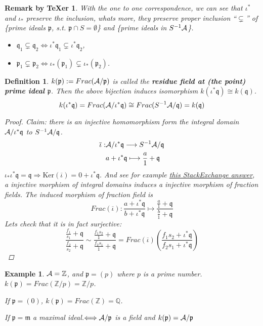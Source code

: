 \documentclass[11pt]{article}
\newtheorem{dfn}[thm]{Definition}
\newtheorem{rmkt}[thm]{Remark by TeXer}
\newtheorem{ex}[thm]{Example}
\newcommand{\intg}{\mathbb Z}
\newcommand{\ratl}{\mathbb Q}
\newcommand{\scm}{{\mathfrak m}}
\newcommand{\scp}{{\mathfrak p}}
\newcommand{\scq}{\mathfrak q}
\newcommand{\cala}{{\cal A}}
\newcommand{\Lrta}{\Longrightarrow}
\newcommand{\lrta}{\longrightarrow}
\newcommand{\Llrta}{\Longleftrightarrow}
\begin{document}
\begin{rmkt}
With the one to one correspondence, we can see that $\iota^*$ and $\iota_*$ preserve the inclusion, whats more, they preserve proper inclusion ``$\subsetneq$'' of \{prime ideals $\scp$, s.t. $\scp\cap S=\emptyset$\} and \{prime ideals in $S^{-1}\cala$\}.
\begin{itemize}
\item $\scq_1\subsetneq \scq_2\Llrta \iota^*\scq_1\subsetneq \iota^*\scq_2$,
\item $\scp_1\subsetneq \scp_2\Llrta\iota_*(\scp_1)\subsetneq\iota_*(\scp_2)$.
\end{itemize}
\end{rmkt}

\begin{dfn}
$k(\scp):=Frac(\cala/\scp)$ is called the \textbf{residue field at (the point) prime ideal $\scp$}.
Then the above bijection induces isomorphism $k(\iota^*\scq)\cong k(\scq)$.
$$
k(\iota^*\scq)=Frac(\cala/\iota^*\scq)\cong Frac(S^{-1}\cala/\scq)=k(\scq)
$$
{\color{red}
\begin{proof}
Claim: there is an injective homomorphism form the integral domain $\cala/\iota^*\scq$ to $S^{-1}\cala/\scq$.
$$
\begin{aligned}
\overline{\iota}:&\cala/\iota^* \scq\lrta S^{-1}\cala/\scq\\
& a+\iota^*\scq\longmapsto \frac{a}{1}+\scq
\end{aligned}
$$
$\iota_*\iota^*\scq=\scq\Lrta \text{Ker}(\overline{\iota})=0+\iota^*\scq$. And see for example  
 \href{https://math.stackexchange.com/questions/2123201/relation-between-integral-domains-with-isomorphic-fraction-fields}{this StackExchange answer}, a injective morphism of integral domains induces a injective morphism of fraction fields. The induced morphism of fraction field is 
 $$
 Frac(\overline{\iota}):\frac{a+\iota^*\scq}{b+\iota^*\scq}\longmapsto \frac{\frac{a}{1}+\scq}{\frac{b}{1}+\scq}
 $$
 Lets check that it is in fact surjective: 
 $$
 \frac{\frac{f_1}{s_1}+\scq}{\frac{f_2}{s_2}+\scq}\sim \frac{\frac{f_1 s_2}{1}+\scq}{\frac{f_2 s_1}{1}+\scq}=Frac(\overline{\iota})\left(\frac{f_1 s_2+\iota^*\scq}{f_2 s_1+\iota^*\scq}\right)
 $$
\end{proof}}
\end{dfn}
\begin{ex}
$\cala=\intg$, and $\scp=(p)$ where $p$ is a prime number. $k(\scp)=Frac(\intg/p)=\intg/p$.

If $\scp=(0)$, $k(\scp)=Frac(\intg)=\ratl$.

If $\scp=\scm$ a  maximal ideal.$\Llrta\cala/\scp$ is a field and $k(\scp)=\cala/\scp$ 
\end{ex}
\end{document}
